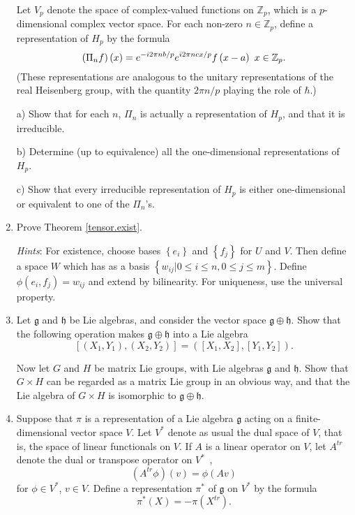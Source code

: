 \documentclass{amsbook}
\let \frak = \mathfrak
\theoremstyle{plain}
\numberwithin{equation}{chapter}
\numberwithin{theorem}{chapter}
\begin{document}
\begin{enumerate}
Let $V_{p}$ denote the space of complex-valued functions on $\mathbb{Z}_{p}$,
which is a $p$-dimensional complex vector space. For each non-zero
$n\in\mathbb{Z}_{p}$, define a representation of $H_{p}$ by the formula
\[
\left(  \Pi_{n}f\right)  \left(  x\right)  =e^{-i2\pi nb/p}e^{i2\pi
ncx/p}f\left(  x-a\right)  \bigskip\ x\in\mathbb{Z}_{p}\text{.}%
\]
(These representations are analogous to the unitary representations of the
real Heisenberg group, with the quantity $2\pi n/p$ playing the role of
$\hbar$.)

a) Show that for each $n$, $\Pi_{n}$ is actually a representation of $H_{p}$,
and that it is irreducible.

b) Determine (up to equivalence) all the one-dimensional representations of
$H_{p}$.

c) Show that every irreducible representation of $H_{p}$ is either
one-dimensional or equivalent to one of the $\Pi_{n}$'s.

\item \label{universal}Prove Theorem \ref{tensor.exist}.

\textit{Hints}: For existence, choose bases $\left\{  e_{i}\right\}  $ and
$\left\{  f_{j}\right\}  $ for $U$ and $V$. Then define a space $W$ which has
as a basis $\left\{  w_{ij}\left|  0\leq i\leq n,0\leq j\leq m\right.
\right\}  $. Define $\phi(e_{i},f_{j})=w_{ij}$ and extend by bilinearity. For
uniqueness, use the universal property.

\item \label{direct.product}Let $\frak{g}$ and $\frak{h}$ be Lie algebras, and
consider the vector space $\frak{g}\oplus\frak{h}$. Show that the following
operation makes $\frak{g}\oplus\frak{h}$ into a Lie algebra
\[
\left[  (X_{1},Y_{1}),(X_{2},Y_{2})\right]  =\left(  [X_{1},X_{2}%
],[Y_{1},Y_{2}]\right)  \text{.}%
\]

Now let $G$ and $H$ be matrix Lie groups, with Lie algebras $\frak{g}$ and
$\frak{h}$. Show that $G\times H$ can be regarded as a matrix Lie group in an
obvious way, and that the Lie algebra of $G\times H$ is isomorphic to
$\frak{g}\oplus\frak{h}$.

\item \label{define.dual}Suppose that $\pi$ is a representation of a Lie
algebra $\frak{g}$ acting on a finite-dimensional vector space $V$. Let
$V^{\ast}$ denote as usual the dual space of $V$, that is, the space of linear
functionals on $V$. If $A$ is a linear operator on $V$, let $A^{tr}$ denote
the dual or transpose operator on $V^{\ast\text{ }}$,
\[
\left(  A^{tr}\phi\right)  \left(  v\right)  =\phi\left(  Av\right)
\]
for $\phi\in V^{\ast}$, $v\in V$. Define a representation $\pi^{\ast}$ of
$\frak{g}$ on $V^{\ast}$ by the formula
\[
\pi^{\ast}\left(  X\right)  =-\pi\left(  X^{tr}\right)  \text{.}%
\]


\end{enumerate}
\end{document}
